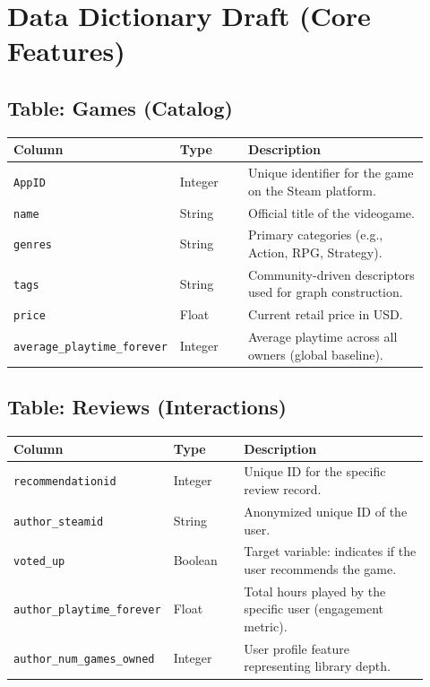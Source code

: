 \documentclass[11pt,a4paper]{article}
\begin{document}
\section{Data Dictionary Draft (Core Features)}
\subsection*{Table: Games (Catalog)}
\begin{longtable}{p{0.22\linewidth}p{0.18\linewidth}p{0.52\linewidth}}
\toprule
\textbf{Column} & \textbf{Type} & \textbf{Description} \\
\midrule
\texttt{AppID} & Integer & Unique identifier for the game on the Steam platform. \\
\texttt{name} & String & Official title of the videogame. \\
\texttt{genres} & String & Primary categories (e.g., Action, RPG, Strategy). \\
\texttt{tags} & String & Community-driven descriptors used for graph construction. \\
\texttt{price} & Float & Current retail price in USD. \\
\texttt{average\_playtime\_forever} & Integer & Average playtime across all owners (global baseline). \\
\bottomrule
\end{longtable}

\subsection*{Table: Reviews (Interactions)}
\begin{longtable}{p{0.22\linewidth}p{0.18\linewidth}p{0.52\linewidth}}
\toprule
\textbf{Column} & \textbf{Type} & \textbf{Description} \\
\midrule
\texttt{recommendationid} & Integer & Unique ID for the specific review record. \\
\texttt{author\_steamid} & String & Anonymized unique ID of the user. \\
\texttt{voted\_up} & Boolean & Target variable: indicates if the user recommends the game. \\
\texttt{author\_playtime\_forever} & Float & Total hours played by the specific user (engagement metric). \\
\texttt{author\_num\_games\_owned} & Integer & User profile feature representing library depth. \\
\bottomrule
\end{longtable}
\end{document}
